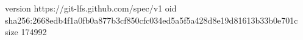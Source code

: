 version https://git-lfs.github.com/spec/v1
oid sha256:2668edb4f1a0fb0a877b3cf850cfc034ed5a5f5a428d8e19d81613b33b0e701c
size 174992
